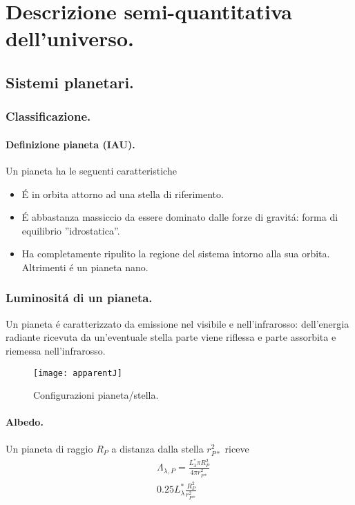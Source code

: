 \documentclass[oneside,12pt,fleqn]{memoir}
\begin{document}
\part{Descrizione semi-quantitativa dell'universo.}


\chapter{Sistemi planetari.}
\PartialToc

\section{Classificazione.}

\subsection{Definizione pianeta (IAU).}

Un pianeta ha le seguenti caratteristiche
\begin{itemize}
    \item \'E in orbita attorno ad una stella di riferimento.
    \item \'E abbastanza massiccio da essere dominato dalle forze di gravit\'a: forma di equilibrio ''idrostatica''.
    \item Ha completamente ripulito la regione del sistema intorno alla sua orbita. Altrimenti \'e un pianeta nano.
\end{itemize}

\section{Luminosit\'a di un pianeta.}

Un pianeta \'e caratterizzato da emissione nel visibile e nell'infrarosso: dell'energia radiante ricevuta da un'eventuale stella parte viene riflessa e parte assorbita e riemessa nell'infrarosso.

\begin{figure}[!ht]
\centering
\texttt{[image: apparentJ]}
\caption{Configurazioni pianeta/stella.}
\end{figure}


\subsection{Albedo.}

Un pianeta di raggio $R_P$ a distanza dalla stella $r_{P*}^2$ riceve
\begin{align*}
    &\Lambda_{\lambda,P}=\frac{L_{\lambda}^*\pi R_P^2}{4\pi r_{P*}^2}\\
    &0.25L_{\lambda}^*\frac{R_P^2}{r_{P*}^2}
\end{align*}
\end{document}

